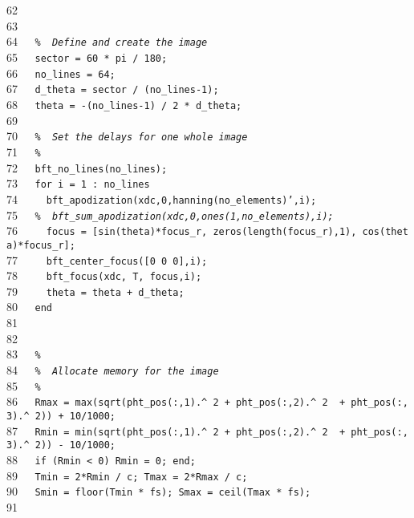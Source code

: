 \documentclass{manual}
\begin{document}
{62{\tt~~~}{\tt }\\
63{\tt~~~}{\tt }\\
64{\tt~~~}{\tt {\sl \%~~Define~and~create~the~image}}\\
65{\tt~~~}{\tt sector~=~60~*~pi~/~180;}\\
66{\tt~~~}{\tt no\_lines~=~64;}\\
67{\tt~~~}{\tt d\_theta~=~sector~/~(no\_lines-1);}\\
68{\tt~~~}{\tt theta~=~-(no\_lines-1)~/~2~*~d\_theta;}\\
69{\tt~~~}{\tt }\\
70{\tt~~~}{\tt {\sl \%~~Set~the~delays~for~one~whole~image}}\\
71{\tt~~~}{\tt {\sl \%}}\\
72{\tt~~~}{\tt bft\_no\_lines(no\_lines);}\\
73{\tt~~~}{\tt for~i~=~1~:~no\_lines}\\
74{\tt~~~}{\tt ~~bft\_apodization(xdc,0,hanning(no\_elements)',i);}\\
75{\tt~~~}{\tt {\sl \%~~bft\_sum\_apodization(xdc,0,ones(1,no\_elements),i);}}\\
76{\tt~~~}{\tt ~~focus~=~[sin(theta)*focus\_r,~zeros(length(focus\_r),1),~cos(theta)*focus\_r];}\\
77{\tt~~~}{\tt ~~bft\_center\_focus([0~0~0],i);}\\
78{\tt~~~}{\tt ~~bft\_focus(xdc,~T,~focus,i);}\\
79{\tt~~~}{\tt ~~theta~=~theta~+~d\_theta;}\\
80{\tt~~~}{\tt end}\\
81{\tt~~~}{\tt }\\
82{\tt~~~}{\tt }\\
83{\tt~~~}{\tt {\sl \%}}\\
84{\tt~~~}{\tt {\sl \%~~Allocate~memory~for~the~image}}\\
85{\tt~~~}{\tt {\sl \%}}\\
86{\tt~~~}{\tt Rmax~=~max(sqrt(pht\_pos(:,1).\^~2~+~pht\_pos(:,2).\^~2~~+~pht\_pos(:,3).\^~2))~+~10/1000;}\\
87{\tt~~~}{\tt Rmin~=~min(sqrt(pht\_pos(:,1).\^~2~+~pht\_pos(:,2).\^~2~~+~pht\_pos(:,3).\^~2))~-~10/1000;}\\
88{\tt~~~}{\tt if~(Rmin~<~0)~Rmin~=~0;~end;}\\
89{\tt~~~}{\tt Tmin~=~2*Rmin~/~c;~Tmax~=~2*Rmax~/~c;}\\
90{\tt~~~}{\tt Smin~=~floor(Tmin~*~fs);~Smax~=~ceil(Tmax~*~fs);}\\
91{\tt~~~}{\tt }\\
}
\end{document}
